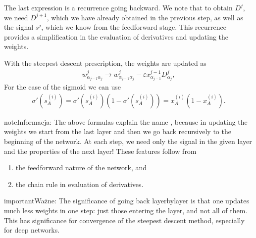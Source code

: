 \documentclass[a4paper,12pt,polish]{jupyterBook}
\begin{document}
\sphinxAtStartPar
The last expression is a recurrence going backward. We note that to obtain \(D^j\), we need \(D^{j+1}\), which we have already obtained in the previous step, as well as the signal \(s^j\), which we know from the feed\sphinxhyphen{}forward stage. This recurrence provides a simplification in the evaluation of derivatives and updating the weights.

\sphinxAtStartPar
With the steepest descent prescription, the weights are updated as
\begin{equation*}
\begin{split} w^j_{\alpha_{j-1} \alpha_j} \to  w^j_{\alpha_{j-1} \alpha_j} -\varepsilon x_{\alpha_{j-1}}^{j-1} D_{\alpha_j}^{j}, \end{split}
\end{equation*}
\sphinxAtStartPar
For the case of the sigmoid we can use
\begin{equation*}
\begin{split}
\sigma'(s_A^{(i)})=\sigma'(s_A^{(i)}) (1-\sigma'(s_A^{(i)})) =x_A^{(i)}(1-x_A^{(i)}).
\end{split}
\end{equation*}
\begin{sphinxadmonition}{note}{Informacja:}
\sphinxAtStartPar
The above formulas explain the name , because in updating the weights we start from the last layer and then we go back recursively to the beginning of the network. At each step, we need only the signal in the given layer and the properties of the next layer! These features follow from
\begin{enumerate}
%
\item {} 
\sphinxAtStartPar
the feed\sphinxhyphen{}forward nature of the network, and

\item {} 
\sphinxAtStartPar
the chain rule in evaluation of derivatives.

\end{enumerate}
\end{sphinxadmonition}

\begin{sphinxadmonition}{important}{Ważne:}
\sphinxAtStartPar
The significance of going back layer\sphinxhyphen{}by\sphinxhyphen{}layer is that one updates much less weights in one step: just those entering the layer, and not all of them. This has significance for convergence of the steepest descent method, especially for deep networks.
\end{sphinxadmonition}
\end{document}
